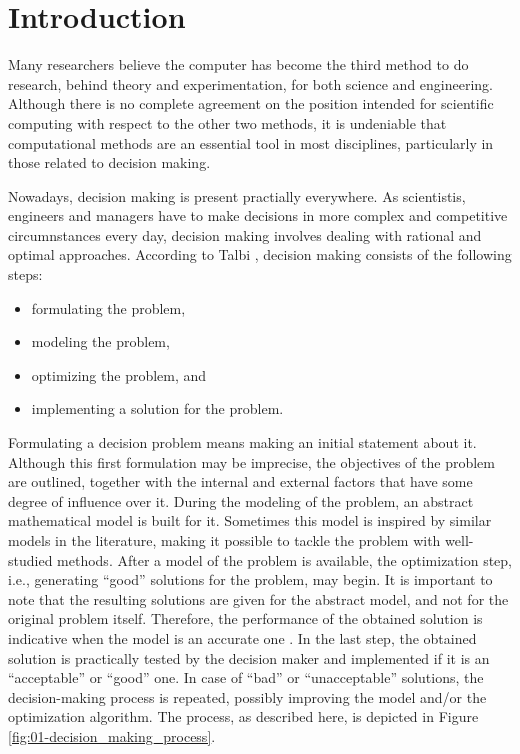
\chapter{Introduction \label{chap:01-Introduction}}


\noindent Many researchers believe the computer has become the third
method to do research, behind theory and experimentation, for both
science and engineering. Although there is no complete agreement on
the position intended for scientific computing with respect to the
other two methods, it is undeniable that computational methods are
an essential tool in most disciplines, particularly in those related
to decision making.

Nowadays, decision making is present practially everywhere. As scientistis,
engineers and managers have to make decisions in more complex and
competitive circumnstances every day, decision making involves dealing
with rational and optimal approaches. According to Talbi \cite{Talbi_Metaheuristics:2009},
decision making consists of the following steps:
\begin{itemize}
\item formulating the problem,
\item modeling the problem, 
\item optimizing the problem, and
\item implementing a solution for the problem.
\end{itemize}
Formulating a decision problem means making an initial statement about
it. Although this first formulation may be imprecise, the objectives
of the problem are outlined, together with the internal and external
factors that have some degree of influence over it. During the modeling
of the problem, an abstract mathematical model is built for it. Sometimes
this model is inspired by similar models in the literature, making
it possible to tackle the problem with well-studied methods. After
a model of the problem is available, the optimization step, i.e.,
generating ``good'' solutions for the problem, may begin. It is
important to note that the resulting solutions are given for the abstract
model, and not for the original problem itself. Therefore, the performance
of the obtained solution is indicative when the model is an accurate
one \cite{Talbi_Metaheuristics:2009}. In the last step, the obtained
solution is practically tested by the decision maker and implemented
if it is an ``acceptable'' or ``good'' one. In case of ``bad''
or ``unacceptable'' solutions, the decision-making process is repeated,
possibly improving the model and/or the optimization algorithm. The
process, as described here, is depicted in Figure \ref{fig:01-decision_making_process}.

